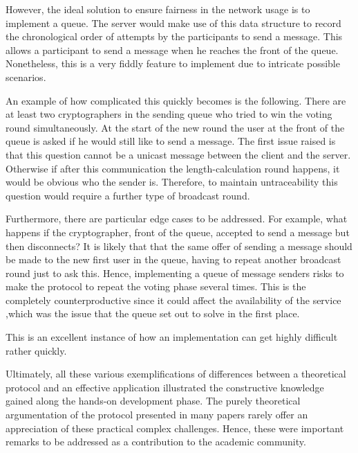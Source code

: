 However, the ideal solution to ensure fairness in the network usage is to implement a queue. The server would make use of this data structure to record the chronological order of attempts by the participants to send a message. This allows a participant to send a message when he reaches the front of the queue. Nonetheless, this is a very fiddly feature to implement due to intricate possible scenarios. 


An example of how complicated this quickly becomes is the following. There are at least two cryptographers in the sending queue who tried to win the voting round simultaneously. At the start of the new round the user at the front of the queue is asked if he would still like to send a message. The first issue raised is that this question cannot be a unicast message between the client and the server. Otherwise if after this communication the length-calculation round happens, it would be obvious who the sender is. Therefore, to maintain untraceability this question would require a further type of broadcast round. 

Furthermore, there are particular edge cases to be addressed. For example, what happens if the cryptographer, front of the queue, accepted to send a message but then disconnects? It is likely that that the same offer of sending a message should be made to the new first user in the queue, having to repeat another broadcast round just to ask this. Hence, implementing a queue of message senders risks to make the protocol to repeat the voting phase several times. This is the completely counterproductive since it could affect the availability of the service ,which was the issue that the queue set out to solve in the first place. 

This is an excellent instance of how an implementation can get highly difficult rather quickly. \newline \newline




Ultimately, all these various exemplifications of differences between a theoretical protocol and an effective application illustrated the constructive knowledge gained along the hands-on development phase. The purely theoretical argumentation of the protocol presented in many papers rarely offer an appreciation of these practical complex challenges. Hence, these were important remarks to be addressed as a contribution to the academic community.

